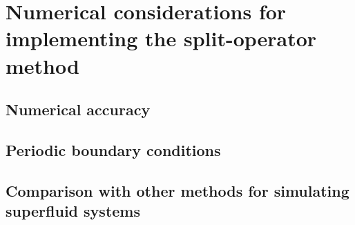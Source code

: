 \section{Numerical considerations for implementing the split-operator method}

\subsection{Numerical accuracy}

\subsection{Periodic boundary conditions}

\subsection{Comparison with other methods for simulating superfluid systems}
